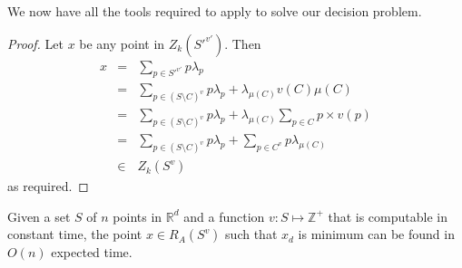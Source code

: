 \documentclass[lotsofwhite]{patmorin}
\begin{document}
We now have all the tools required to apply  to solve our
decision problem.
\begin{proof}
Let $x$ be any point in $Z_k(S'^{v'})$.  Then
\begin{eqnarray*}
    x &=& \sum_{p\in S'^{v'}} p\lambda_p \\
      &=& \sum_{p\in (S\setminus C)^v} p\lambda_p 
          + \lambda_{\mu(C)}v(C)\mu(C) \\
      &=& \sum_{p\in (S\setminus C)^v} p\lambda_p 
          + \lambda_{\mu(C)}\sum_{p\in C} p\times v(p) \\
      &=& \sum_{p\in (S\setminus C)^v} p\lambda_p  
          + \sum_{p\in C^v}p\lambda_{\mu(C)} \\
      &\in& Z_k(S^{v})
\end{eqnarray*}
as required.
\end{proof}

\begin{thm}
Given a set $S$ of $n$ points in $\mathbb{R}^d$ and a 
function $v:S\mapsto\mathbb{Z}^+$ that is computable in constant
time, the point $x\in R_A(S^v)$ such
that $x_d$ is minimum can be found in $O(n)$ expected
time.
\end{thm}
\end{document}
